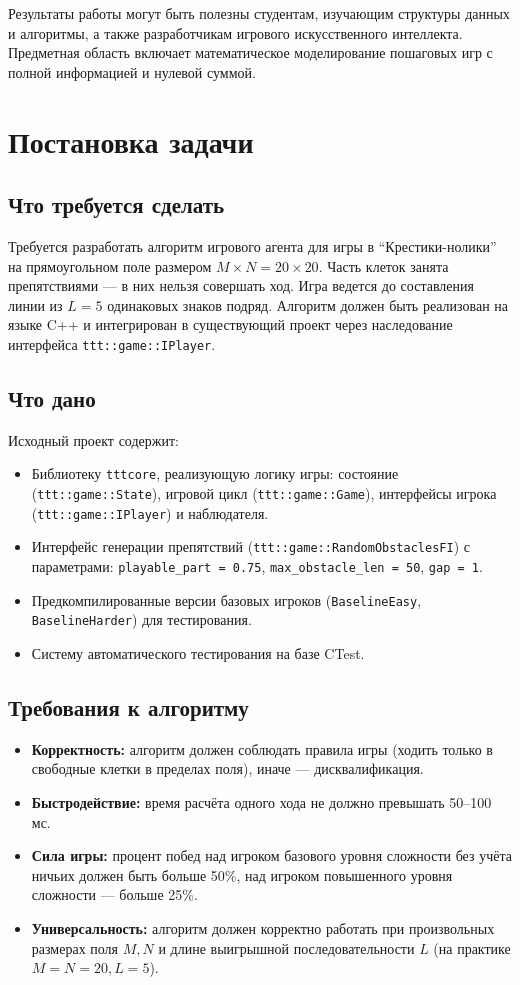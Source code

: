 \documentclass[a4paper,14pt]{extreport}
\begin{document}
Результаты работы могут быть полезны студентам, изучающим структуры данных и алгоритмы, а также разработчикам игрового искусственного интеллекта. Предметная область включает математическое моделирование пошаговых игр с полной информацией и нулевой суммой.

\chapter{Постановка задачи}
\section{Что требуется сделать}
Требуется разработать алгоритм игрового агента для игры в ``Крестики-нолики'' на прямоугольном поле размером $M \times N = 20 \times 20$. Часть клеток занята препятствиями — в них нельзя совершать ход. Игра ведется до составления линии из $L = 5$ одинаковых знаков подряд. Алгоритм должен быть реализован на языке C++ и интегрирован в существующий проект через наследование интерфейса \texttt{ttt::game::IPlayer}.

\section{Что дано}
Исходный проект содержит:
\begin{itemize}
    \item Библиотеку \texttt{tttcore}, реализующую логику игры: состояние (\texttt{ttt::game::State}), игровой цикл (\texttt{ttt::game::Game}), интерфейсы игрока (\texttt{ttt::game::IPlayer}) и наблюдателя.
    \item Интерфейс генерации препятствий (\texttt{ttt::game::RandomObstaclesFI}) с параметрами: \texttt{playable\_part = 0.75}, \texttt{max\_obstacle\_len = 50}, \texttt{gap = 1}.
    \item Предкомпилированные версии базовых игроков (\texttt{BaselineEasy}, \texttt{BaselineHarder}) для тестирования.
    \item Систему автоматического тестирования на базе CTest.
\end{itemize}

\section{Требования к алгоритму}
\begin{itemize}
    \item \textbf{Корректность:} алгоритм должен соблюдать правила игры (ходить только в свободные клетки в пределах поля), иначе — дисквалификация.
    \item \textbf{Быстродействие:} время расчёта одного хода не должно превышать 50–100 мс.
    \item \textbf{Сила игры:} процент побед над игроком базового уровня сложности без учёта ничьих должен быть больше 50\%, над игроком повышенного уровня сложности — больше 25\%.
    \item \textbf{Универсальность:} алгоритм должен корректно работать при произвольных размерах поля $M, N$ и длине выигрышной последовательности $L$ (на практике $M = N = 20, L = 5$).
\end{itemize}
\end{document}
